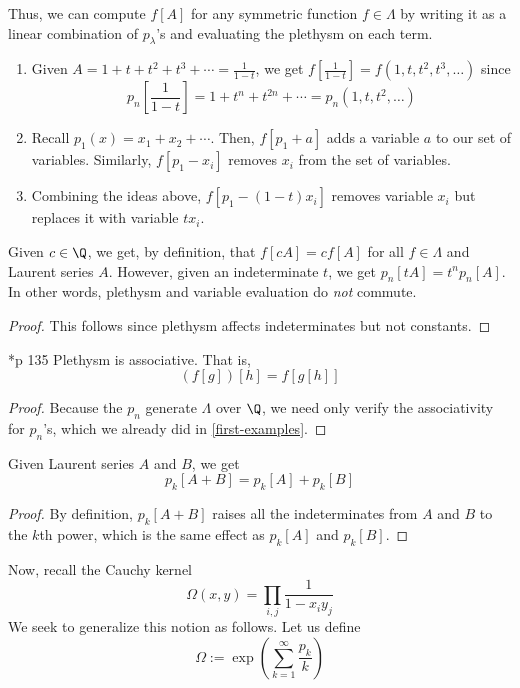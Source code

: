 \documentclass[11pt,leqno,oneside]{amsart}
\numberwithin{thm}{section}
\newcommand{\sym}{\Lambda}
\begin{document}
Thus, we can compute \(f[A]\) for any symmetric function \(f \in
\sym\) by writing it as a linear combination of \(p_\lambda\)'s and
evaluating the plethysm on each term.
\begin{example}
  \begin{enumerate}
  \item Given \(A = 1+t+t^2+t^3+\cdots = \frac{1}{1-t}\), we get
  \(f[\frac{1}{1-t}] = f(1,t,t^2,t^3,\ldots)\) since \[
    p_n\left[\frac{1}{1-t}\right] = 1+t^n+t^{2n}+\cdots =
    p_n(1,t,t^2,\ldots) 
  \]
  \item Recall \(p_1(x) = x_1 + x_2 + \cdots\). Then, \(f[p_1+a]\) adds a
    variable \(a\) to our set of variables. Similarly, \(f[p_1-x_i]\)
    removes \(x_i\) from the set of variables.
  \item Combining the ideas above, \(f[p_1-(1-t)x_i]\) removes
    variable \(x_i\) but replaces it with variable \(tx_i\).
  \end{enumerate}
\end{example}
\begin{prop}
  Given \(c \in \Q\), we get, by definition, that \(f[cA] = cf[A]\)
  for all \(f \in \sym\) and Laurent series \(A\). However, given an
  indeterminate \(t\), we get \(p_n[tA] = t^n p_n[A]\). In other
  words, plethysm and variable evaluation do \emph{not} commute.
\end{prop}
\begin{proof}
  This follows since plethysm affects indeterminates but not
  constants. 
\end{proof}
\begin{prop}
  \cite{macdonald}*{p 135} Plethysm is associative. That is, \[
   (f[g])[h] = f[g[h]]
  \]
\end{prop}
\begin{proof}
  Because the \(p_n\) generate \(\sym\) over \(\Q\), we need only
  verify the associativity for \(p_n\)'s, which we already did in
  \ref{first-examples}. 
\end{proof}
\begin{lem}
  Given Laurent series \(A\) and \(B\), we get \[
    p_k[A+B] = p_k[A]+p_k[B]
  \]
\end{lem}
\begin{proof}
  By definition, \(p_k[A+B]\) raises all the indeterminates from \(A\)
  and \(B\) to the \(k\)th power, which is the same effect as
  \(p_k[A]\) and \(p_k[B]\).
\end{proof}
Now, recall the Cauchy kernel \[
  \Omega(x,y) = \prod_{i,j} \frac{1}{1-x_i y_j}
\]
We seek to generalize this notion as follows. Let us define \[
  \Omega := \exp\left( \sum_{k=1}^\infty \frac{p_k}{k} \right) 
\]
\end{document}
